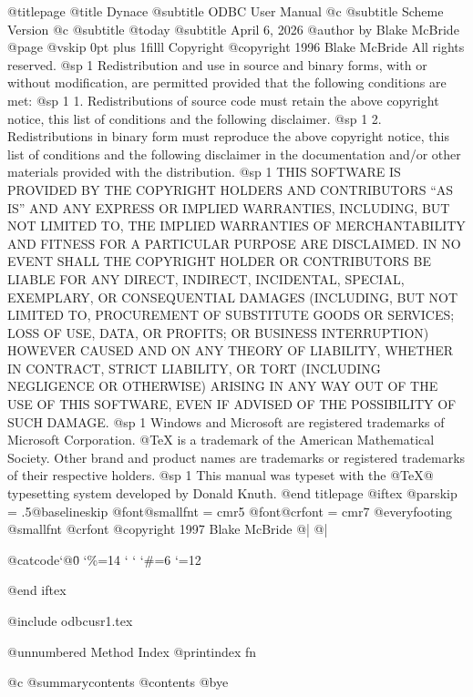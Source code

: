 @titlepage
@title Dynace
@subtitle ODBC User Manual
@c @subtitle Scheme Version
@c @subtitle @today{}
@subtitle April 6, 2026
@author by Blake McBride
@page
@vskip 0pt plus 1filll
Copyright  @copyright{} 1996 Blake McBride
All rights reserved.
@sp 1
Redistribution and use in source and binary forms, with or without
modification, are permitted provided that the following conditions are
met:
@sp 1
1. Redistributions of source code must retain the above copyright
notice, this list of conditions and the following disclaimer.
@sp 1
2. Redistributions in binary form must reproduce the above copyright
notice, this list of conditions and the following disclaimer in the
documentation and/or other materials provided with the distribution.
@sp 1
THIS SOFTWARE IS PROVIDED BY THE COPYRIGHT HOLDERS AND CONTRIBUTORS
``AS IS'' AND ANY EXPRESS OR IMPLIED WARRANTIES, INCLUDING, BUT NOT
LIMITED TO, THE IMPLIED WARRANTIES OF MERCHANTABILITY AND FITNESS FOR
A PARTICULAR PURPOSE ARE DISCLAIMED. IN NO EVENT SHALL THE COPYRIGHT
HOLDER OR CONTRIBUTORS BE LIABLE FOR ANY DIRECT, INDIRECT, INCIDENTAL,
SPECIAL, EXEMPLARY, OR CONSEQUENTIAL DAMAGES (INCLUDING, BUT NOT
LIMITED TO, PROCUREMENT OF SUBSTITUTE GOODS OR SERVICES; LOSS OF USE,
DATA, OR PROFITS; OR BUSINESS INTERRUPTION) HOWEVER CAUSED AND ON ANY
THEORY OF LIABILITY, WHETHER IN CONTRACT, STRICT LIABILITY, OR TORT
(INCLUDING NEGLIGENCE OR OTHERWISE) ARISING IN ANY WAY OUT OF THE USE
OF THIS SOFTWARE, EVEN IF ADVISED OF THE POSSIBILITY OF SUCH DAMAGE.
@sp 1
Windows and Microsoft are registered trademarks of
Microsoft Corporation.  @TeX{} is a trademark of the American
Mathematical Society.  Other brand and product names are trademarks or
registered trademarks of their respective holders.
@sp 1
This manual was typeset with the @TeX@ typesetting system developed by
Donald Knuth.
@end titlepage
@iftex
@parskip = .5@baselineskip
@font@smallfnt = cmr5
@font@crfont = cmr7
@everyfooting {@smallfnt {@crfont @copyright{}} 1997 Blake McBride} @| @|

{@catcode`@\=0 \catcode`\%=14 \catcode` \catcode` \catcode `\#=6 \catcode `\@=12

}

@end iftex


@include odbcusr1.tex


@unnumbered Method Index
@printindex fn

@c @summarycontents
@contents
@bye

